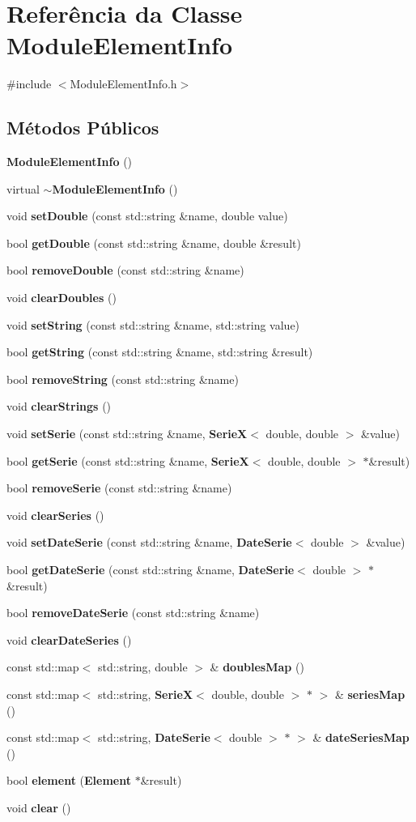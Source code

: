\section{Referência da Classe Module\+Element\+Info}
\label{class_module_element_info}


{\ttfamily \#include $<$Module\+Element\+Info.\+h$>$}

\subsection*{Métodos Públicos}
\begin{DoxyCompactItemize}
\item 
{\bf Module\+Element\+Info} ()
\item 
virtual {\bf $\sim$\+Module\+Element\+Info} ()
\item 
void {\bf set\+Double} (const std\+::string \&name, double value)
\item 
bool {\bf get\+Double} (const std\+::string \&name, double \&result)
\item 
bool {\bf remove\+Double} (const std\+::string \&name)
\item 
void {\bf clear\+Doubles} ()
\item 
void {\bf set\+String} (const std\+::string \&name, std\+::string value)
\item 
bool {\bf get\+String} (const std\+::string \&name, std\+::string \&result)
\item 
bool {\bf remove\+String} (const std\+::string \&name)
\item 
void {\bf clear\+Strings} ()
\item 
void {\bf set\+Serie} (const std\+::string \&name, {\bf SerieX}$<$ double, double $>$ \&value)
\item 
bool {\bf get\+Serie} (const std\+::string \&name, {\bf SerieX}$<$ double, double $>$ $\ast$\&result)
\item 
bool {\bf remove\+Serie} (const std\+::string \&name)
\item 
void {\bf clear\+Series} ()
\item 
void {\bf set\+Date\+Serie} (const std\+::string \&name, {\bf Date\+Serie}$<$ double $>$ \&value)
\item 
bool {\bf get\+Date\+Serie} (const std\+::string \&name, {\bf Date\+Serie}$<$ double $>$ $\ast$\&result)
\item 
bool {\bf remove\+Date\+Serie} (const std\+::string \&name)
\item 
void {\bf clear\+Date\+Series} ()
\item 
const std\+::map$<$ std\+::string, double $>$ \& {\bf doubles\+Map} ()
\item 
const std\+::map$<$ std\+::string, {\bf SerieX}$<$ double, double $>$ $\ast$ $>$ \& {\bf series\+Map} ()
\item 
const std\+::map$<$ std\+::string, {\bf Date\+Serie}$<$ double $>$ $\ast$ $>$ \& {\bf date\+Series\+Map} ()
\item 
bool {\bf element} ({\bf Element} $\ast$\&result)
\item 
void {\bf clear} ()
\end{DoxyCompactItemize}
